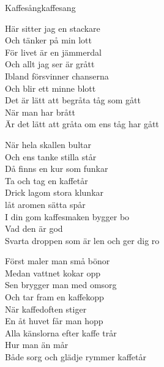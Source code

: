\begin{song}{Kaffesång}{kaffesang}
\begin{vers}
Här sitter jag en stackare \\
Och tänker på min lott\\
För livet är en jämmerdal \\
Och allt jag ser är grått\\
Ibland försvinner chanserna \\
Och blir ett minne blott\\
Det är lätt att begråta tåg som gått\\
När man har brått\\
Är det lätt att gråta om ens tåg har gått\\
\end{vers}
\begin{vers}
När hela skallen bultar \\
Och ens tanke stilla står\\
Då finns en kur som funkar\\
Ta och tag en kaffetår\\
Drick lagom stora klunkar\\
låt aromen sätta spår\\
I din gom kaffesmaken bygger bo\\
Vad den är god\\
Svarta droppen som är len och ger dig ro\\
\end{vers}
\begin{vers}
Först maler man små bönor\\
Medan vattnet kokar opp\\
Sen brygger man med omsorg\\
Och tar fram en kaffekopp\\
När kaffedoften stiger\\
En åt huvet får man hopp\\
Alla känslorna efter kaffe trår\\
Hur man än mår\\
Både sorg och glädje rymmer kaffetår\\
\end{vers}
\end{song}
